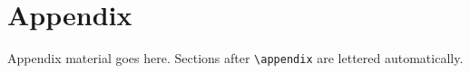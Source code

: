 \section{Appendix}
\label{app:extra}

Appendix material goes here. Sections after \verb|\appendix| are lettered
automatically.
